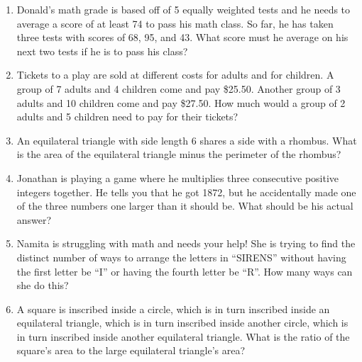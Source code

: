 \documentclass[11pt]{article}
\theoremstyle{definition}
\newcommand{\fdbox}[2]{\fbox{\sffamily\LARGE\vphantom y#1: \bfseries #2} \par\vspace{1em}} %
\begin{document}
\newcommand{\logo}{%
\begin{minipage}[b]{22em}
\centering\noindent
\\[0.5em]
\begin{minipage}[t][4em][t]{12em} \centering
{\huge \bfseries ${\bf 26^{\text{th}}}$ TJIMO } \\
\textsc{\large Alexandria, Virginia}
\end{minipage}
\end{minipage}
\vspace*{-0.05em}
}
\newcommand{\sevenpoints}{Time limit: 30 minutes.}
\newcommand{\righthead}{\fdbox{Round}{Practice Team}}


\begin{enumerate}

\item Donald's math grade is based off of 5 equally weighted tests and he needs to average a score of at least 74 to pass his math class. So far, he has taken three tests with scores of 68, 95, and 43. What score must he average on his next two tests if he is to pass his class?

\item Tickets to a play are sold at different costs for adults and for children. A group of 7 adults and 4 children come and pay \$25.50. Another group of 3 adults and 10 children come and pay \$27.50. How much would a group of 2 adults and 5 children need to pay for their tickets?

\item An equilateral triangle with side length 6 shares a side with a rhombus. What is the area of the equilateral triangle minus the perimeter of the rhombus?

\item Jonathan is playing a game where he multiplies three consecutive positive integers together. He tells you that he got 1872, but he accidentally made one of the three numbers one larger than it should be. What should be his actual answer?

\item Namita is struggling with math and needs your help! She is trying to find the distinct number of ways to arrange the letters in "`SIRENS"' without having the first letter be "`I"' or having the fourth letter be "`R"'. How many ways can she do this? 

\item A square is inscribed inside a circle, which is in turn inscribed inside an equilateral triangle, which is in turn inscribed inside another circle, which is in turn inscribed inside another equilateral triangle. What is the ratio of the square's area to the large equilateral triangle's area?


\end{enumerate}
\end{document}
